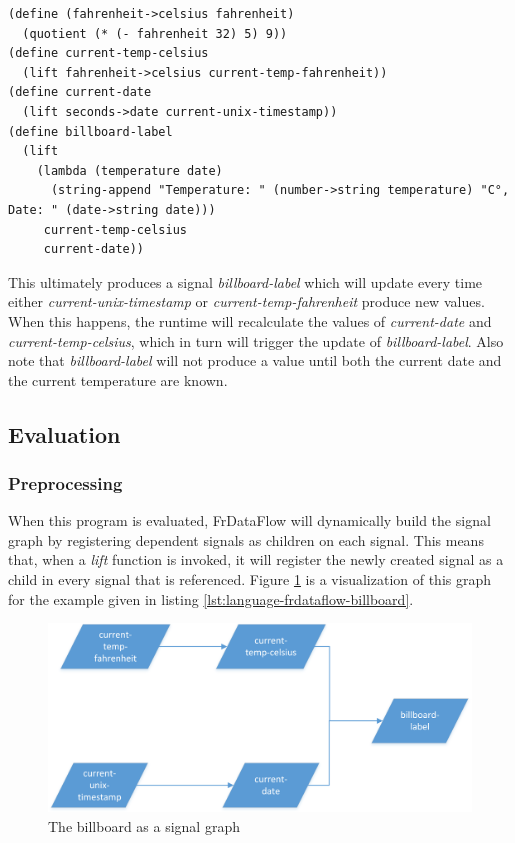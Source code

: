 \begin{lstlisting}[caption={Billboard},captionpos=b,label={lst:language-frdataflow-billboard}]
(define (fahrenheit->celsius fahrenheit)
  (quotient (* (- fahrenheit 32) 5) 9))
(define current-temp-celsius
  (lift fahrenheit->celsius current-temp-fahrenheit))
(define current-date
  (lift seconds->date current-unix-timestamp))
(define billboard-label
  (lift
    (lambda (temperature date)
      (string-append "Temperature: " (number->string temperature) "C°, Date: " (date->string date)))
     current-temp-celsius
     current-date))   
\end{lstlisting}

This ultimately produces a signal \textit{billboard-label} which will update every time either \textit{current-unix-timestamp} or \textit{current-temp-fahrenheit} produce new values. When this happens, the runtime will recalculate the values of \textit{current-date} and \textit{current-temp-celsius}, which in turn will trigger the update of \textit{billboard-label}. Also note that \textit{billboard-label} will not produce a value until both the current date and the current temperature are known. 

\subsection{Evaluation}

\subsubsection{Preprocessing}

When this program is evaluated, FrDataFlow will dynamically build the signal graph by registering dependent signals as children on each signal. This means that, when a \textit{lift} function is invoked, it will register the newly created signal as a child in every signal that is referenced. Figure \ref{fig:language-frdataflow-example} is a visualization of this graph for the example given in listing \ref{lst:language-frdataflow-billboard}.

\begin{figure}[h]
	\centerline{\includegraphics[width=\textwidth]{images/language-frdataflow-example.png}}
	\caption{The billboard as a signal graph}
	\label{fig:language-frdataflow-example}
\end{figure}

